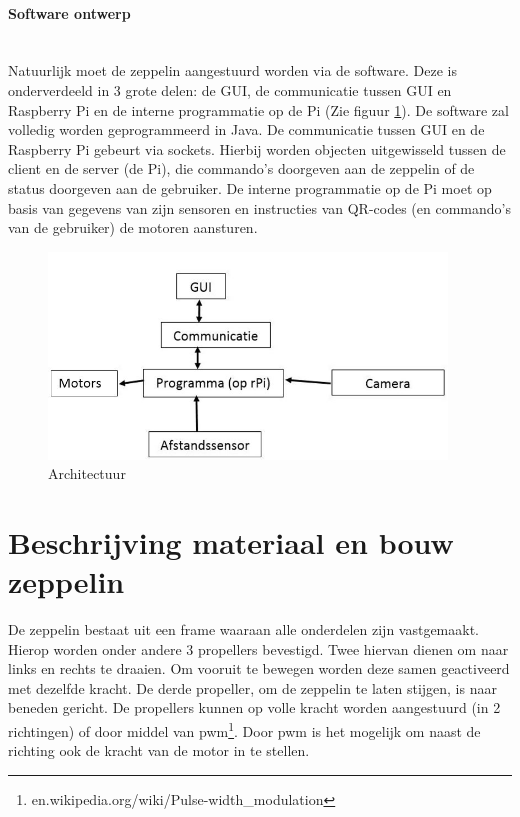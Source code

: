 \documentclass[eind]{penoverslag}
\begin{document}
\paragraph{Software ontwerp}
~\\
Natuurlijk moet de zeppelin aangestuurd worden via de software. Deze is onderverdeeld in 3 grote delen: de GUI, de communicatie tussen GUI en Raspberry Pi en de interne programmatie op de Pi (Zie figuur \ref{schema}). De software zal volledig worden geprogrammeerd in Java. 
De communicatie tussen GUI en de Raspberry Pi gebeurt via sockets. Hierbij worden objecten uitgewisseld tussen de client en de server (de Pi), die commando's doorgeven aan de zeppelin of de status doorgeven aan de gebruiker. De interne programmatie op de Pi moet op basis van gegevens van zijn sensoren en instructies van QR-codes (en commando's van de gebruiker) de motoren aansturen. 

\begin{figure}[ht!]
\centering
\includegraphics[height=55mm]{Schema.jpg}
\caption{Architectuur}
\label{schema}
\end{figure}


\section{Beschrijving materiaal en bouw zeppelin}
De zeppelin bestaat uit een frame waaraan alle onderdelen zijn vastgemaakt. Hierop worden onder andere 3 propellers bevestigd. Twee hiervan dienen om naar links en rechts te draaien. Om vooruit te bewegen worden deze samen geactiveerd met dezelfde kracht. De derde propeller, om de zeppelin te laten stijgen, is naar beneden gericht. De propellers kunnen op volle kracht worden aangestuurd (in 2 richtingen) of door middel van pwm\footnote{en.wikipedia.org/wiki/Pulse-width\_modulation}. Door pwm is het mogelijk om naast de richting ook de kracht van de motor in te stellen.~\\
\end{document}
